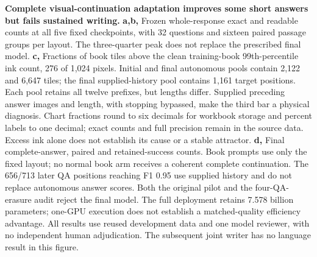 \textbf{Complete visual-continuation adaptation improves some short answers
but fails sustained writing.}
\textbf{a,b,} Frozen whole-response exact and readable counts at all five fixed
checkpoints, with 32 questions and sixteen paired passage groups per layout.
The three-quarter peak does not replace the prescribed final model.
\textbf{c,} Fractions of book tiles above the clean training-book 99th-percentile
ink count, 276 of 1,024 pixels. Initial and final autonomous pools contain 2,122
and 6,647 tiles; the final supplied-history pool contains 1,161 target positions.
Each pool retains all twelve prefixes, but lengths differ. Supplied preceding
answer images and length, with stopping bypassed, make the third bar a physical
diagnosis. Chart fractions round to six decimals for workbook storage and percent
labels to one decimal; exact counts and full precision remain in the
source data. Excess ink alone does not establish its cause or a stable attractor.
\textbf{d,} Final complete-answer, paired and retained-success counts. Book prompts
use only the fixed layout; no normal book arm receives a coherent complete
continuation. The 656/713 later QA positions reaching F1 0.95 use supplied history
and do not replace autonomous answer scores. Both the original pilot and the
four-QA-erasure audit reject the final model. The full deployment retains
7.578 billion parameters; one-GPU execution does not establish a matched-quality
efficiency advantage. All results use reused development data and one model
reviewer, with no independent human adjudication. The subsequent joint writer
has no language result in this figure.

